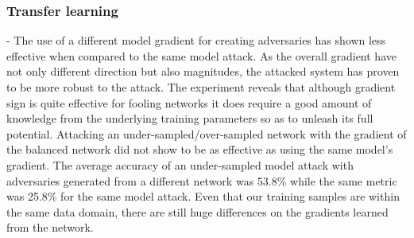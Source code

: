 \documentclass[runningheads,a4paper]{llncs}
\begin{document}
\subsubsection{Transfer learning} - The use of a different model gradient for creating adversaries has shown less effective when compared to the same model attack. As the overall gradient have not only different direction but also magnitudes, the attacked system has proven to be more robust to the attack. The experiment reveals that although gradient sign is quite effective for fooling networks it does require a good amount of knowledge from the underlying training parameters so as to unleash its full potential. Attacking an under-sampled/over-sampled network with the gradient of the balanced network did not show to be as effective as using the same model's gradient. The average accuracy of an under-sampled model attack with adversaries generated from a different network was 53.8\% while the same metric was 25.8\% for the same model attack. Even that our training samples are within the same data domain, there are still huge differences on the gradients learned from the network. 
\end{document}
